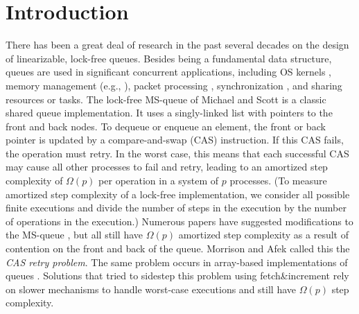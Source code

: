 
\section{Introduction}

There has been a great deal of research in the past several decades on the design of linearizable, lock-free queues.
Besides being a fundamental data structure, queues are used in
significant concurrent applications, including OS kernels \cite{MP91}, memory management (e.g., \cite{BBFRSW21}),
packet processing \cite{DPDK}, synchronization \cite{KAE23},
and sharing resources or tasks.
The lock-free MS-queue of Michael and Scott \cite{MS98} is a classic shared queue implementation.
It uses a singly-linked list with pointers to the front and back nodes.
To dequeue or enqueue an element, the front or back pointer is updated by a 
compare-and-swap (CAS) instruction.
If this CAS fails, the operation must retry.
In the worst case, this means that each successful CAS may cause all other processes to
fail and retry, leading to an amortized step complexity of $\Omega(p)$ per operation in a system of $p$ processes.
(To measure amortized step complexity of a lock-free implementation, we consider all possible finite executions
and divide the number of steps in the execution by the number of operations  in the execution.)
Numerous papers have suggested modifications to the MS-queue \cite{DBLP:conf/opodis/HoffmanSS07,DBLP:conf/podc/KoganH14,DBLP:conf/ppopp/KoganP11,DBLP:journals/dc/Ladan-MozesS08,MKLLP22,DBLP:conf/spaa/MoirNSS05,RC17}, but 
all still have $\Omega(p)$ amortized step complexity as a result of
contention on the front and back of the queue.
Morrison and Afek \cite{DBLP:conf/ppopp/MorrisonA13} called this the \emph{CAS retry problem}.
The same problem occurs in array-based implementations of queues \cite{DBLP:conf/iceccs/ColvinG05,DBLP:conf/icdcn/Shafiei09,DBLP:conf/spaa/TsigasZ01,DBLP:conf/opodis/GidenstamST10}.
Solutions that tried to sidestep this problem using fetch\&increment \cite{DBLP:conf/ppopp/MorrisonA13,DBLP:conf/ppopp/YangM16,Nik19,10.1145/3490148.3538572}
rely on slower mechanisms to handle worst-case executions and still have $\Omega(p)$ step complexity.

